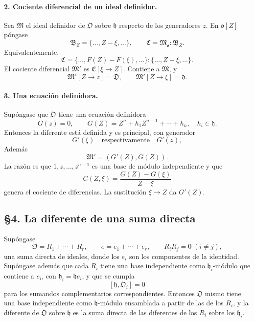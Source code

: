 \paragraph{2. Cociente diferencial de un ideal definidor.}
Sea $\mathfrak M$ el ideal definidor de $\mathfrak O$ sobre $\mathfrak h$ respecto de los generadores $z$. En $\mathfrak o[Z]$ póngase
\[
        \mathfrak B_Z=\{\ldots,Z-\xi,\ldots\},
        \qquad
        \mathfrak C=\mathfrak M_{\mathfrak o}:\mathfrak B_Z.
\]
Equivalentemente,
\[
        \mathfrak C=\{\ldots,F(Z)-F(\xi),\ldots\}:\{\ldots,Z-\xi,\ldots\}.
\]
El cociente diferencial $\mathfrak M'$ es $\mathfrak C[\xi\to Z]$. Contiene a $\mathfrak M$, y
\[
        \mathfrak M'[Z\to z]=\mathfrak D,
        \qquad
        \mathfrak M'[Z\to\xi]=\mathfrak d.
\]

\paragraph{3. Una ecuación definidora.}
Supóngase que $\mathfrak O$ tiene una ecuación definidora
\[
        G(z)=0,
        \qquad
        G(Z)=Z^n+h_1Z^{n-1}+\cdots+h_n,
        \quad h_i\in\mathfrak h.
\]
Entonces la diferente está definida y es principal, con generador
\[
        G'(\xi) \quad\text{respectivamente}\quad G'(z),
\]
Además
\[
        \mathfrak M'=(G'(Z),G(Z)).
\]
La razón es que $1,z,\ldots,z^{n-1}$ es una base de módulo independiente y que
\[
        C(Z,\xi)=\frac{G(Z)-G(\xi)}{Z-\xi}
\]
genera el cociente de diferencias. La sustitución $\xi\to Z$ da $G'(Z)$.

\subsection*{§4. La diferente de una suma directa}

Supóngase
\[
        \mathfrak O=R_1+\cdots+R_r,
        \qquad
        e=e_1+\cdots+e_r,
        \qquad
        R_iR_j=0\;(i\ne j),
\]
una suma directa de ideales, donde los $e_i$ son los componentes de la identidad. Supóngase además que cada $R_i$ tiene una base independiente como $\mathfrak h_i$-módulo que contiene a $e_i$, con $\mathfrak h_i=\mathfrak h e_i$, y que se cumpla
\[
        [\mathfrak h,\mathfrak O_i]=0
\]
para los sumandos complementarios correspondientes. Entonces $\mathfrak O$ mismo tiene una base independiente como $\mathfrak h$-módulo ensamblada a partir de las de los $R_i$, y la diferente de $\mathfrak O$ sobre $\mathfrak h$ es la suma directa de las diferentes de los $R_i$ sobre los $\mathfrak h_i$.

